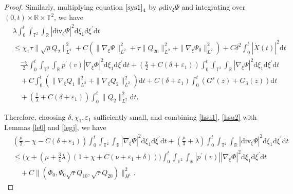 \documentclass[10pt,reqno]{amsart}
\numberwithin{equation}{section}
\newcommand{\dif}{\mathrm{d}}
\newcommand{\ddiv}{\mathrm{div}}
\begin{document}
\begin{proof}
Similarly, multiplying equation $\eqref{sys1}_4$ by $\rho\ddiv_\xi\Psi$ and integrating over $(0, t)\times\mathbb{R}\times\mathbb{T}^2$, we have
\begin{equation}\label{hsu2}
\begin{aligned}
&\lambda\int_0^t\int_{\mathbb{T}^2}\int_{\mathbb{R}}
   |\ddiv_\xi\Psi|^2
\dif \xi_1\dif \xi^{\prime}\dif t\\
&\le
\chi_1\tau\|\sqrt\rho Q_{2}\|_{L^2}^2
+C(\|\nabla_\xi\Psi\|_{L^2}^2+\tau\|Q_{20}\|_{L^2}^2+\|\nabla_\xi\Psi_0\|_{L^2}^2)
+C\delta^2\int_0^t|\dot X(t)|^2\dif t\\
&\quad
\frac{-\chi}{2}\int_0^t\int_{\mathbb{T}^2}\int_{\mathbb{R}}p^\prime(v)|\nabla_\xi\Phi|^2\dif \xi_1\dif \xi^{\prime}\dif t
+(\frac{\chi}{2}+C(\delta+\varepsilon_1))\int_0^t\int_{\mathbb{T}^2}\int_{\mathbb{R}}|\nabla_\xi\Psi|^2\dif \xi_1\dif \xi^{\prime}\dif t\\
&\quad+C\int_0^t\left(
\|\nabla_\xi Q_1\|_{L^2}^2+\|\nabla_\xi Q_2\|_{L^2}^2\right)\dif t
+C(\delta+\varepsilon_1)\int_0^t\left(G^s(z)+G_3(z)\right)\dif t\\
&\quad+\left(\frac{1}{\lambda}+C(\delta+\varepsilon_1)\right)
\int_0^t\|Q_2\|_{L^2}^2\dif t.
\end{aligned}
\end{equation}

Therefore, choosing $\delta,\chi_1,\varepsilon_1$ sufficiently small, and combining \eqref{hsu1}, \eqref{hsu2} with Lemmas \ref{le0} and \ref{legj}, we have
\begin{equation}\label{hsgj10302}
	\begin{aligned}
		&(\frac{\mu}{2}-\chi-C(\delta+\varepsilon_1))\int_0^t\int_{\mathbb{T}^2}\int_{\mathbb{R}}|\nabla_\xi\Psi|^2\dif \xi_1\dif \xi^{\prime}\dif t
		+\left(\frac{\mu}{3}+\lambda\right)\int_0^t\int_{\mathbb{T}^2}\int_{\mathbb{R}}
		|\ddiv_\xi\Psi|^2
		\dif \xi_1\dif \xi^{\prime}\dif t\\
		&\le\Big(\chi+(\mu+\frac{3}{4}\lambda)(1+\chi+C(\nu+\varepsilon_1+\delta))\Big)\int_0^t\int_{\mathbb{T}^2}\int_{\mathbb{R}}|p^\prime(v)||\nabla_\xi\Phi|^2\dif \xi_1\dif \xi^{\prime}\dif t
		\\
		&\quad%
		+C\|(\Phi_0, \Psi_0
		\sqrt{\tau}Q_{10}, \sqrt{\tau}Q_{20})\|_{H^1}^2.
	\end{aligned}
\end{equation}


\end{proof}
\end{document}
